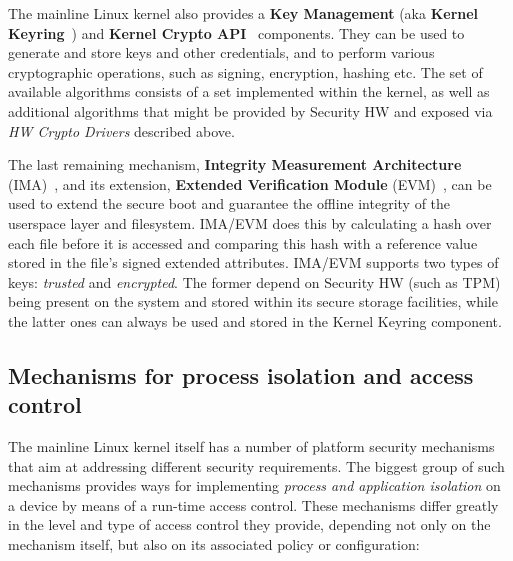 The mainline Linux kernel also provides a \textbf{Key Management} (aka \textbf{Kernel Keyring}~\cite{keyrings}) and \textbf{Kernel Crypto API}~\cite{kernelcryptoapi} components. They can be used to generate and store keys and other credentials, and to perform various cryptographic operations, such as signing, encryption, hashing etc. The set of available algorithms consists of a set implemented within the kernel, as well as additional algorithms that might be provided by Security HW and exposed via \textit{HW Crypto Drivers} described above.

The last remaining mechanism, \textbf{Integrity Measurement Architecture} (IMA)~\cite{ima}, and its extension, \textbf{Extended Verification Module} (EVM)~\cite{ima}, can be used to extend the secure boot and guarantee the offline integrity of the userspace layer and filesystem. IMA/EVM does this by calculating a hash over each file before it is accessed and comparing this hash with a reference value stored in the file's signed extended attributes. IMA/EVM supports two types of keys: \textit{trusted} and \textit{encrypted}. The former depend on Security HW (such as TPM) being present on the system and stored within its secure storage facilities, while the latter ones can always be used and stored in the Kernel Keyring component. 

\subsection{Mechanisms for process isolation and access control}

The mainline Linux kernel itself has a number of platform security mechanisms that aim at addressing different security requirements. The biggest group of such mechanisms provides ways for implementing \textit{process and application isolation} on a device by means of a run-time access control. These mechanisms differ greatly in the level and type of access control they provide, depending not only on the mechanism itself, but also on its associated policy or configuration:

